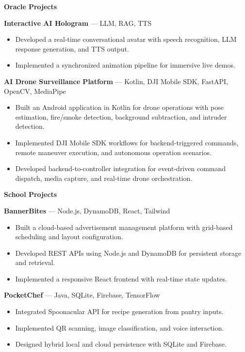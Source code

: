 \documentclass[10pt,a4paper]{article}
\begin{document}
\textbf{Oracle Projects}

\textbf{Interactive AI Hologram} --- LLM, RAG, TTS
\begin{itemize}
  \item Developed a real-time conversational avatar with speech recognition, LLM response generation, and TTS output.
  \item Implemented a synchronized animation pipeline for immersive live demos.
\end{itemize}

\textbf{AI Drone Surveillance Platform} --- Kotlin, DJI Mobile SDK, FastAPI, OpenCV, MediaPipe
\begin{itemize}
  \item Built an Android application in Kotlin for drone operations with pose estimation, fire/smoke detection, background subtraction, and intruder detection.
  \item Implemented DJI Mobile SDK workflows for backend-triggered commands, remote maneuver execution, and autonomous operation scenarios.
  \item Developed backend-to-controller integration for event-driven command dispatch, media capture, and real-time drone orchestration.
\end{itemize}

\textbf{School Projects}

\textbf{BannerBites} --- Node.js, DynamoDB, React, Tailwind
\begin{itemize}
  \item Built a cloud-based advertisement management platform with grid-based scheduling and layout configuration.
  \item Developed REST APIs using Node.js and DynamoDB for persistent storage and retrieval.
  \item Implemented a responsive React frontend with real-time state updates.
\end{itemize}

\textbf{PocketChef} --- Java, SQLite, Firebase, TensorFlow
\begin{itemize}
  \item Integrated Spoonacular API for recipe generation from pantry inputs.
  \item Implemented QR scanning, image classification, and voice interaction.
  \item Designed hybrid local and cloud persistence with SQLite and Firebase.
\end{itemize}
\end{document}

